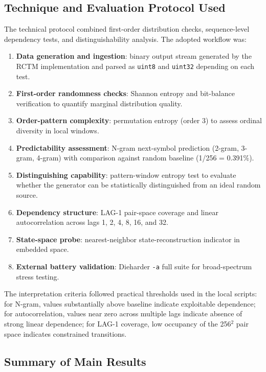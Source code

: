 \subsection{Technique and Evaluation Protocol Used}

The technical protocol combined first-order distribution checks, sequence-level dependency tests, and distinguishability analysis. The adopted workflow was:

\begin{enumerate}
\item \textbf{Data generation and ingestion}: binary output stream generated by the RCTM implementation and parsed as \texttt{uint8} and \texttt{uint32} depending on each test.
\item \textbf{First-order randomness checks}: Shannon entropy and bit-balance verification to quantify marginal distribution quality.
\item \textbf{Order-pattern complexity}: permutation entropy (order 3) to assess ordinal diversity in local windows.
\item \textbf{Predictability assessment}: N-gram next-symbol prediction (2-gram, 3-gram, 4-gram) with comparison against random baseline (1/256 = 0.391\%).
\item \textbf{Distinguishing capability}: pattern-window entropy test to evaluate whether the generator can be statistically distinguished from an ideal random source.
\item \textbf{Dependency structure}: LAG-1 pair-space coverage and linear autocorrelation across lags 1, 2, 4, 8, 16, and 32.
\item \textbf{State-space probe}: nearest-neighbor state-reconstruction indicator in embedded space.
\item \textbf{External battery validation}: Dieharder \texttt{-a} full suite for broad-spectrum stress testing.
\end{enumerate}

The interpretation criteria followed practical thresholds used in the local scripts: for N-gram, values substantially above baseline indicate exploitable dependence; for autocorrelation, values near zero across multiple lags indicate absence of strong linear dependence; for LAG-1 coverage, low occupancy of the 256$^2$ pair space indicates constrained transitions.

\subsection{Summary of Main Results}

